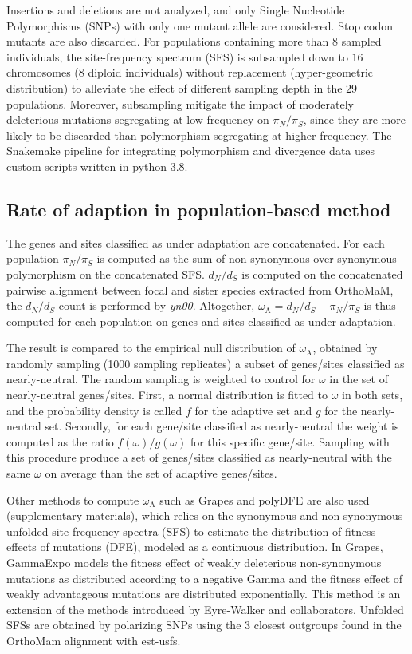 \documentclass{article}
\newcommand{\dn}{d_N}
\newcommand{\ds}{d_S}
\newcommand{\dnds}{\dn / \ds}
\newcommand{\pn}{\pi_N}
\newcommand{\ps}{\pi_S}
\newcommand{\pnps}{\pn / \ps}
\begin{document}
Insertions and deletions are not analyzed, and only Single Nucleotide Polymorphisms (SNPs) with only one mutant allele are considered.
Stop codon mutants are also discarded.
For populations containing more than $8$ sampled individuals, the site-frequency spectrum (SFS) is subsampled down to $16$ chromosomes ($8$ diploid individuals) without replacement (hyper-geometric distribution) to alleviate the effect of different sampling depth in the $29$ populations.
Moreover, subsampling mitigate the impact of moderately deleterious mutations segregating at low frequency on $\pnps$, since they are more likely to be discarded than polymorphism segregating at higher frequency.
The Snakemake pipeline for integrating polymorphism and divergence data uses custom scripts written in python 3.8.

\subsection*{Rate of adaption in population-based method}

The genes and sites classified as under adaptation are concatenated.
For each population $\pnps$ is computed as the sum of non-synonymous over synonymous polymorphism on the concatenated SFS\@.
$\dnds$ is computed on the concatenated pairwise alignment between focal and sister species extracted from OrthoMaM, the $\dnds$ count is performed by \textit{yn00}.
Altogether, $\omega_{\mathrm{A}} = \dnds - \pnps$ is thus computed for each population on genes and sites classified as under adaptation.

The result is compared to the empirical null distribution of $\omega_{\mathrm{A}}$, obtained by randomly sampling (1000 sampling replicates) a subset of genes/sites classified as nearly-neutral.
The random sampling is weighted to control for $\omega$ in the set of nearly-neutral genes/sites.
First, a normal distribution is fitted to $\omega$ in both sets, and the probability density is called $f$ for the adaptive set and $g$ for the nearly-neutral set.
Secondly, for each gene/site classified as nearly-neutral the weight is computed as the ratio $f(\omega)/g(\omega)$ for this specific gene/site.
Sampling with this procedure produce a set of genes/sites classified as nearly-neutral with the same $\omega$ on average than the set of adaptive genes/sites.

Other methods to compute $\omega_{\mathrm{A}}$ such as Grapes\cite{galtier_adaptive_2016} and polyDFE\cite{tataru_polydfe_2020} are also used (supplementary materials), which relies on the synonymous and non-synonymous unfolded site-frequency spectra (SFS) to estimate the distribution of fitness effects of mutations (DFE), modeled as a continuous distribution.
In Grapes, GammaExpo models the fitness effect of weakly deleterious non-synonymous mutations as distributed according to a negative Gamma and the fitness effect of weakly advantageous mutations are distributed exponentially.
This method is an extension of the methods introduced by Eyre-Walker and collaborators\cite{eyre-walker_distribution_2006, eyre-walker_estimating_2009}.
Unfolded SFSs are obtained by polarizing SNPs using the $3$ closest outgroups found in the OrthoMam alignment with est-usfs\cite{keightley_inferring_2018}.
\end{document}
